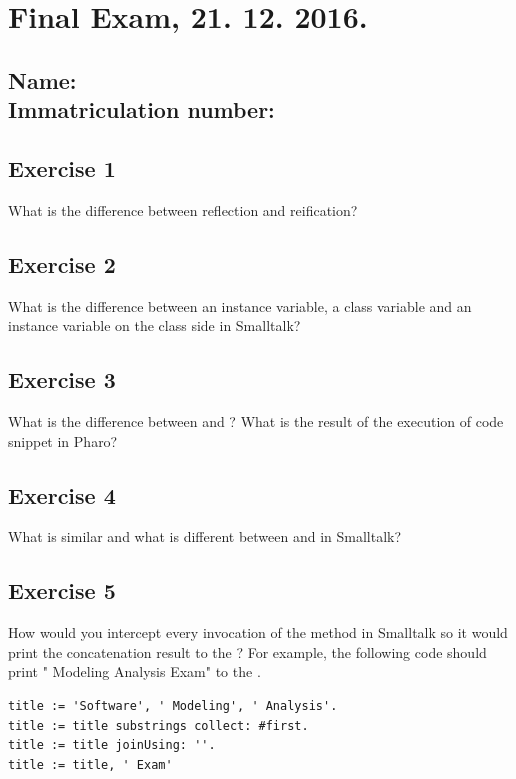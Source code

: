 \documentclass [11pt, a4wide, twoside]{article}
\begin{document}
\section*{Final Exam, 21. 12. 2016.}

\subsection*{Name: \\ Immatriculation number:}

\subsection*{Exercise 1}
What is the difference between reflection and reification? 
\vspace{4cm}

\subsection*{Exercise 2}
What is the difference between an instance variable, a class variable and an instance variable on the class side in Smalltalk?

\vspace{4cm}

\subsection*{Exercise 3}
What is the difference between  and ? What is the result of the execution of code snippet  in Pharo?
\vspace{4cm}

\newpage

\subsection*{Exercise 4}
What is similar and what is different between  and  in Smalltalk?
\vspace{4cm}

\subsection*{Exercise 5}
How would you intercept every invocation of the method  in Smalltalk so it would print the concatenation result to the ? For example, the following code should print " Modeling Analysis Exam" to the .
\begin{lstlisting}
title := 'Software', ' Modeling', ' Analysis'.
title := title substrings collect: #first.
title := title joinUsing: ''.
title := title, ' Exam'
\end{lstlisting}
\vspace{4cm}
\end{document}
